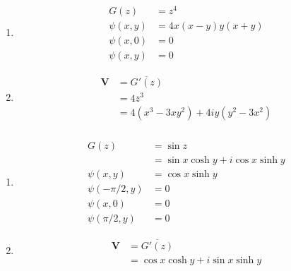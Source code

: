 \documentclass{article}
\renewcommand{\vec}[1]{\boldsymbol{\mathbf{#1}}}
\begin{document}
\begin{enumerate}
  \item

        \begin{align*}
          G(z)       & = z^4                   \\
          \psi(x, y) & = 4 x (x - y) y (x + y) \\
          \psi(x, 0) & = 0                     \\
          \psi(x, y) & = 0
        \end{align*}

  \item

        \begin{align*}
          \vec{V} & = \overline{G'(z)}                        \\
                  & = 4 \overline{z}^3                        \\
                  & = 4 (x^3 - 3 x y^2) + 4 i y (y^2 - 3 x^2)
        \end{align*}
\end{enumerate}

\setcounter{subsubsection}{10}
\subsubsection{}

\begin{enumerate}
  \item

        \begin{align*}
          G(z)              & = \sin z                            \\
                            & = \sin x \cosh y + i \cos x \sinh y \\
          \psi(x, y)        & = \cos x \sinh y                    \\
          \psi(-\pi / 2, y) & = 0                                 \\
          \psi(x, 0)        & = 0                                 \\
          \psi(\pi / 2, y)  & = 0
        \end{align*}

  \item

        \begin{align*}
          \vec{V} & = \overline{G'(z)}                  \\
                  & = \cos x \cosh y + i \sin x \sinh y
        \end{align*}
\end{enumerate}
\end{document}
